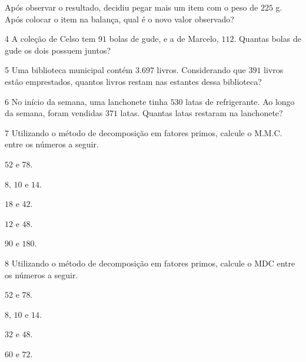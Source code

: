 Após observar o resultado, decidiu pegar mais um item com o peso de
$225$ g. Após colocar o item na balança, qual é o novo valor observado?


\num{4}  A coleção de Celso tem $91$ bolas de gude, e a de Marcelo, $112$. Quantas
bolas de gude os dois possuem juntos?


\num{5}  Uma biblioteca municipal contém $3.697$ livros. Considerando que $391$
livros estão emprestados, quantos livros restam nas estantes dessa
biblioteca?


\num{6}  No início da semana, uma lanchonete tinha $530$ latas de refrigerante.
Ao longo da semana, foram vendidas $371$ latas. Quantas latas restaram na
lanchonete?


\num{7}  Utilizando o método de decomposição em fatores primos, calcule o M.M.C. entre os números a seguir.

\begin{escolha}
\item $52$ e $78$.\\

\item $8$, $10$ e $14$.\\

\item $18$ e $42$.\\

\item $12$ e $48$.\\

\item $90$ e $180$.\\

\end{escolha}

\num{8}  Utilizando o método de decomposição em fatores primos, calcule o MDC entre os números a seguir.

\begin{escolha}
\item $52$ e $78$.\\

\item $8$, $10$ e $14$.\\

\item $32$ e $48$.\\

\item $60$ e $72$.\\

\end{escolha}


